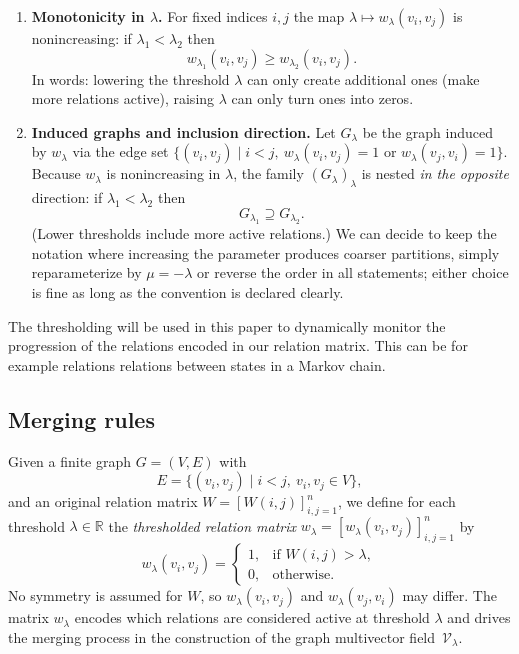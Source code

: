 \documentclass{article}
\theoremstyle{definition}
\theoremstyle{plain}
\theoremstyle{remark}
\newcommand{\1}{\mathbbm{1}}  %
\begin{document}
\begin{enumerate}
  \item \textbf{Monotonicity in \(\lambda\).} For fixed indices \(i,j\) the map
    \(\lambda \mapsto w_\lambda(v_i,v_j)\) is nonincreasing: if
    \(\lambda_1 < \lambda_2\) then
    \[
      w_{\lambda_1}(v_i,v_j) \ge w_{\lambda_2}(v_i,v_j).
    \]
    In words: lowering the threshold \(\lambda\) can only create additional
    ones (make more relations active), raising \(\lambda\) can only turn
    ones into zeros.

  \item \textbf{Induced graphs and inclusion direction.}  Let \(G_\lambda\)
    be the graph induced by \(w_\lambda\) via the edge set
    \(\{(v_i,v_j)\mid i<j,\ w_\lambda(v_i,v_j)=1 \text{ or } w_\lambda(v_j,v_i)=1\}\).
    Because \(w_\lambda\) is nonincreasing in \(\lambda\), the family
    \((G_\lambda)_\lambda\) is nested \emph{in the opposite} direction:
    if \(\lambda_1 < \lambda_2\) then
    \[
      G_{\lambda_1} \supseteq G_{\lambda_2}.
    \]
    (Lower thresholds include more active relations.)
    We can decide to keep the notation where increasing the parameter
    produces coarser partitions, simply reparameterize by
    \(\mu=-\lambda\) or reverse the order in all statements; either choice is
    fine as long as the convention is declared clearly.
 
  
\end{enumerate}
The thresholding will be used in this paper to dynamically monitor the progression of the relations encoded in our relation matrix. This can be for example relations relations between states in a Markov chain.






\subsection{Merging rules}
\label{sec:merging-rules}

Given a finite graph $G=(V,E)$ with
\[
E=\{(v_i,v_j)\mid i<j,\ v_i,v_j\in V\},
\]
and an original relation matrix $W=[W(i,j)]_{i,j=1}^n$,
we define for each threshold $\lambda\in\mathbb{R}$ the \emph{thresholded relation matrix}
$w_\lambda=[w_\lambda(v_i,v_j)]_{i,j=1}^n$ by
\begin{equation}\label{eq:wlambda}
w_\lambda(v_i,v_j)=
\begin{cases}
1,& \text{if } W(i,j)>\lambda,\\[3pt]
0,& \text{otherwise.}
\end{cases}
\end{equation}
No symmetry is assumed for $W$, so $w_\lambda(v_i,v_j)$ and
$w_\lambda(v_j,v_i)$ may differ.
The matrix $w_\lambda$ encodes which relations are considered active at
threshold $\lambda$ and drives the merging process in the construction of
the graph multivector field~$\mathcal V_\lambda$.
\end{document}
